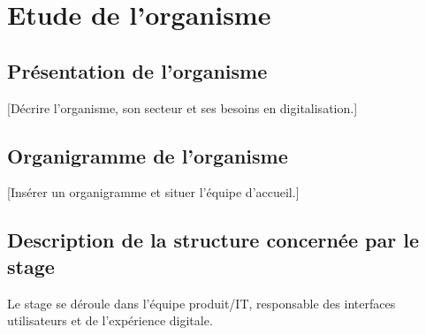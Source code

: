 \chapter{Etude de l'organisme}

\section{Présentation de l'organisme}
[Décrire l'organisme, son secteur et ses besoins en digitalisation.]

\section{Organigramme de l'organisme}
[Insérer un organigramme et situer l'équipe d'accueil.]

\section{Description de la structure concernée par le stage}
Le stage se déroule dans l'équipe produit/IT, responsable des interfaces utilisateurs et de l'expérience digitale.

